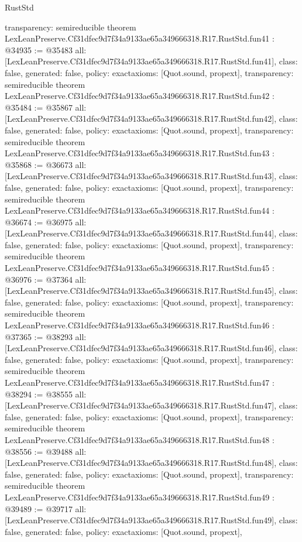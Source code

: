 \begin{lexlean}{RustStd}
\begin{coremodule}
{  transparency: semireducible
}
theorem LexLeanPreserve.Cf31dfec9d7f34a9133ae65a349666318.R17.RustStd.fun41 : @34935 := @35483 {
  all: [LexLeanPreserve.Cf31dfec9d7f34a9133ae65a349666318.R17.RustStd.fun41],
  class: false,
  generated: false,
  policy: exact{axioms: [Quot.sound, propext]},
  transparency: semireducible
}
theorem LexLeanPreserve.Cf31dfec9d7f34a9133ae65a349666318.R17.RustStd.fun42 : @35484 := @35867 {
  all: [LexLeanPreserve.Cf31dfec9d7f34a9133ae65a349666318.R17.RustStd.fun42],
  class: false,
  generated: false,
  policy: exact{axioms: [Quot.sound, propext]},
  transparency: semireducible
}
theorem LexLeanPreserve.Cf31dfec9d7f34a9133ae65a349666318.R17.RustStd.fun43 : @35868 := @36673 {
  all: [LexLeanPreserve.Cf31dfec9d7f34a9133ae65a349666318.R17.RustStd.fun43],
  class: false,
  generated: false,
  policy: exact{axioms: [Quot.sound, propext]},
  transparency: semireducible
}
theorem LexLeanPreserve.Cf31dfec9d7f34a9133ae65a349666318.R17.RustStd.fun44 : @36674 := @36975 {
  all: [LexLeanPreserve.Cf31dfec9d7f34a9133ae65a349666318.R17.RustStd.fun44],
  class: false,
  generated: false,
  policy: exact{axioms: [Quot.sound, propext]},
  transparency: semireducible
}
theorem LexLeanPreserve.Cf31dfec9d7f34a9133ae65a349666318.R17.RustStd.fun45 : @36976 := @37364 {
  all: [LexLeanPreserve.Cf31dfec9d7f34a9133ae65a349666318.R17.RustStd.fun45],
  class: false,
  generated: false,
  policy: exact{axioms: [Quot.sound, propext]},
  transparency: semireducible
}
theorem LexLeanPreserve.Cf31dfec9d7f34a9133ae65a349666318.R17.RustStd.fun46 : @37365 := @38293 {
  all: [LexLeanPreserve.Cf31dfec9d7f34a9133ae65a349666318.R17.RustStd.fun46],
  class: false,
  generated: false,
  policy: exact{axioms: [Quot.sound, propext]},
  transparency: semireducible
}
theorem LexLeanPreserve.Cf31dfec9d7f34a9133ae65a349666318.R17.RustStd.fun47 : @38294 := @38555 {
  all: [LexLeanPreserve.Cf31dfec9d7f34a9133ae65a349666318.R17.RustStd.fun47],
  class: false,
  generated: false,
  policy: exact{axioms: [Quot.sound, propext]},
  transparency: semireducible
}
theorem LexLeanPreserve.Cf31dfec9d7f34a9133ae65a349666318.R17.RustStd.fun48 : @38556 := @39488 {
  all: [LexLeanPreserve.Cf31dfec9d7f34a9133ae65a349666318.R17.RustStd.fun48],
  class: false,
  generated: false,
  policy: exact{axioms: [Quot.sound, propext]},
  transparency: semireducible
}
theorem LexLeanPreserve.Cf31dfec9d7f34a9133ae65a349666318.R17.RustStd.fun49 : @39489 := @39717 {
  all: [LexLeanPreserve.Cf31dfec9d7f34a9133ae65a349666318.R17.RustStd.fun49],
  class: false,
  generated: false,
  policy: exact{axioms: [Quot.sound, propext]},
}
\end{coremodule}
\end{lexlean}
